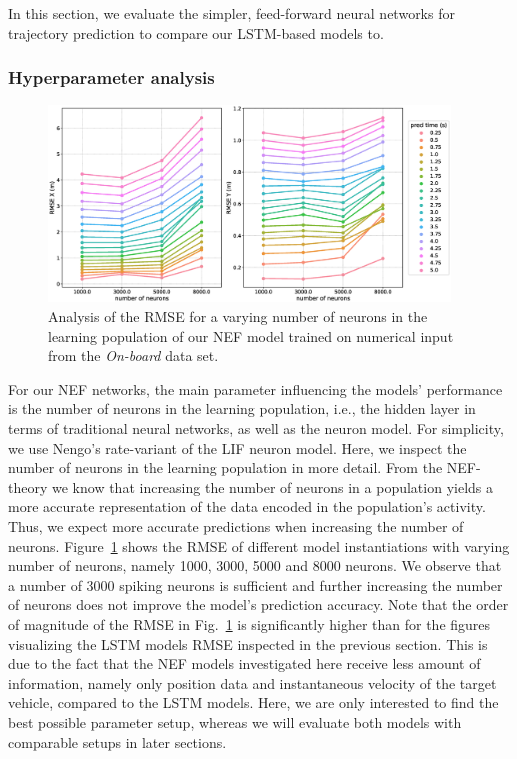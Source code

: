 In this section, we evaluate the simpler, feed-forward neural networks for trajectory prediction to compare our \ac{LSTM}-based models to.

\subsubsection{Hyperparameter analysis}%
\label{ssubsec:hyperparameter_analysis_nef}

\begin{figure}[t!]
  \centering
  \includegraphics[width=0.95\textwidth]{imgs/nef_num_neurons_analysis.eps}
  \caption{Analysis of the \ac{RMSE} for a varying number of neurons in the learning population of our \ac{NEF} model trained on numerical input from the \emph{On-board} data set.}
  \label{fig:nef_num_neurons_analysis}
\end{figure}

For our \ac{NEF} networks, the main parameter influencing the models' performance is the number of neurons in the learning population, i.e., the hidden layer in terms of traditional neural networks, as well as the neuron model.
For simplicity, we use \acs{Nengo}'s rate-variant of the \ac{LIF} neuron model.
Here, we inspect the number of neurons in the learning population in more detail.
From the \ac{NEF}-theory \parencite{Eliasmith2003} we know that increasing the number of neurons in a population yields a more accurate representation of the data encoded in the population's activity.
Thus, we expect more accurate predictions when increasing the number of neurons.
Figure~\ref{fig:nef_num_neurons_analysis} shows the \ac{RMSE} of different model instantiations with varying number of neurons, namely \num{1000}, \num{3000}, \num{5000} and \num{8000} neurons.
We observe that a number of \num{3000} spiking neurons is sufficient and further increasing the number of neurons does not improve the model's prediction accuracy.
Note that the order of magnitude of the \ac{RMSE} in Fig.~\ref{fig:nef_num_neurons_analysis} is significantly higher than for the figures visualizing the \ac{LSTM} models \ac{RMSE} inspected in the previous section. 
This is due to the fact that the \ac{NEF} models investigated here receive less amount of information, namely only position data and instantaneous velocity of the target vehicle, compared to the \ac{LSTM} models.
Here, we are only interested to find the best possible parameter setup, whereas we will evaluate both models with comparable setups in later sections.

